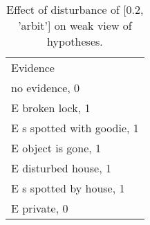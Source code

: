 \begin{table}\begin{tabular}{l}\toprule\multirow{2}{*}{Evidence} \\\\\midrule
no evidence, 0 & \\E broken lock, 1 & \\E s spotted with goodie, 1 & \\E object is gone, 1 & \\E disturbed house, 1 & \\E s spotted by house, 1 & \\E private, 0 & \\\bottomrule\end{tabular}\caption{Effect of disturbance of [0.2, 'arbit'] on weak view of hypotheses.}\end{table}
